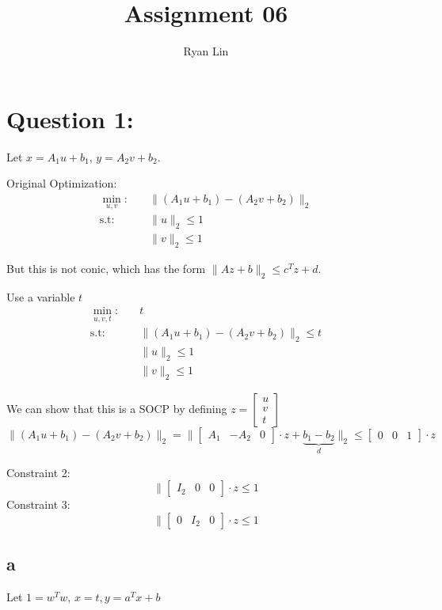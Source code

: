 \documentclass{report}
\title{Assignment 06}
\author{Ryan Lin}
\date{}
\begin{document}
\maketitle
\section{Question 1:}

Let $ x = A_{1}u + b_1 $, $ y = A_{2}v +b_{2} $. 

Original Optimization: 
\begin{align*}
\min_{u,v}: \quad & \lVert (A_1u + b_1) - (A_2v + b_2)\rVert_{2} \\
\text{s.t}: \quad & \lVert u \rVert_{2}  \le 1 \\
		  & \lVert v \rVert_{2} \le 1
\end{align*}


But this is not conic, which has the form $ \lVert Az + b\rVert_{2} \le c^{T}z +d $. 


Use a variable $ t $ 
\begin{align*}
\min_{u,v,t}: \quad & t \\
\text{s.t}: \quad & \lVert (A_1u + b_1) - (A_2v +b_2) \rVert_{2} \le t \\
		  & \lVert u \rVert_{2} \le 1 \\
		  & \lVert v \rVert_{2} \le 1
\end{align*}


We can show that this is a SOCP by defining $ z = \begin{bmatrix}
	u \\
	v\\
	t
\end{bmatrix} $ 
\[
\lVert (A_1u + b_1) - (A_2v +b_2) \rVert_{2} = \lVert \begin{bmatrix}
	A_1 &-A_2 & 0
\end{bmatrix} \cdot  z + \underbrace{b_1 - b_2}_{d}\rVert_{2} \le \begin{bmatrix}
	0 &0 &1
\end{bmatrix} \cdot z
\]

Constraint 2: 
\[
	\lVert \begin{bmatrix}
		I_{2} &0 &0
	\end{bmatrix} \cdot z \le 1
\]
Constraint 3: 
\[
	\lVert \begin{bmatrix}
		0 &I_2 &0
	\end{bmatrix} \cdot z \le 1
\]


\newpage

\subsection{a}
Let $ 1 = w^{T}w $, $ x=t, y= a^{T}x + b$
\end{document}
